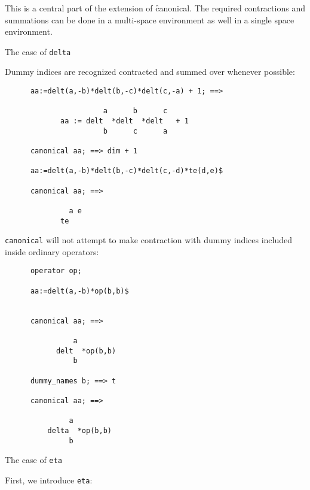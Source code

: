 This is a central part of the extension of \f{canonical}.
The required contractions and summations can be done in a
multi-space environment as well in a single space environment.
\begin{center}
The case of \texttt{delta}
\end{center}
Dummy indices are recognized  contracted and summed over whenever possible:
\begin{verbatim}
      aa:=delt(a,-b)*delt(b,-c)*delt(c,-a) + 1; ==>

                       a      b      c
             aa := delt  *delt  *delt   + 1
                       b      c      a

      canonical aa; ==> dim + 1

      aa:=delt(a,-b)*delt(b,-c)*delt(c,-d)*te(d,e)$

      canonical aa; ==>

               a e
             te
\end{verbatim}
\texttt{canonical} will not attempt to make contraction with
dummy indices included inside ordinary operators:
\begin{verbatim}
      operator op;

      aa:=delt(a,-b)*op(b,b)$


      canonical aa; ==>

                a
            delt  *op(b,b)
                b

      dummy_names b; ==> t

      canonical aa; ==>

               a
          delta  *op(b,b)
               b
\end{verbatim}
\begin{center}
The case of \texttt{eta}
\end{center}
First, we introduce  \texttt{eta}:
